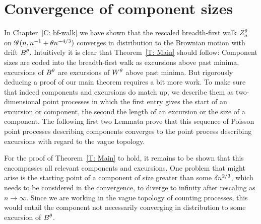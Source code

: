 
\chapter{Convergence of component sizes} \label{C: convergence}


In Chapter~\ref{C: bf-walk} we have shown that the rescaled breadth-first walk $\bar{Z}^{\theta}_n$ on $\mathscr{G}(n, n^{-1} + \theta n^{-4/3})$
converges in distribution to the Brownian motion with drift $B^{\theta}$.
Intuitively it is clear that Theorem~\ref{T: Main} should follow:
Component sizes are coded into the breadth-first walk as excursions above past minima,
excursions of $B^{\theta}$ are excursions of $W^{\theta}$ above past minima.
But rigorously deducing a proof of our main theorem requires a bit more work.
To make sure that indeed components and excursions do match up,
we describe them as two-dimensional point processes
in which the first entry gives the start of an excursion or component, 
the second the length of an excursion or the size of a component.
The following first two Lemmata prove that this sequence of Poisson point processes describing components 
converges to the point process describing excursions with regard to the vague topology.

For the proof of Theorem~\ref{T: Main} to hold, it remains to be shown that this encompasses all relevant components and excursions.
One problem that might arise is the starting point of a component of size greater than some $\delta n^{2 / 3}$, 
which needs to be considered in the convergence, to diverge to infinity after rescaling as $n \rightarrow \infty$.
Since we are working in the vague topology of counting processes, 
this would entail the component not necessarily converging in distribution to some excursion of $B^{\theta}$.



